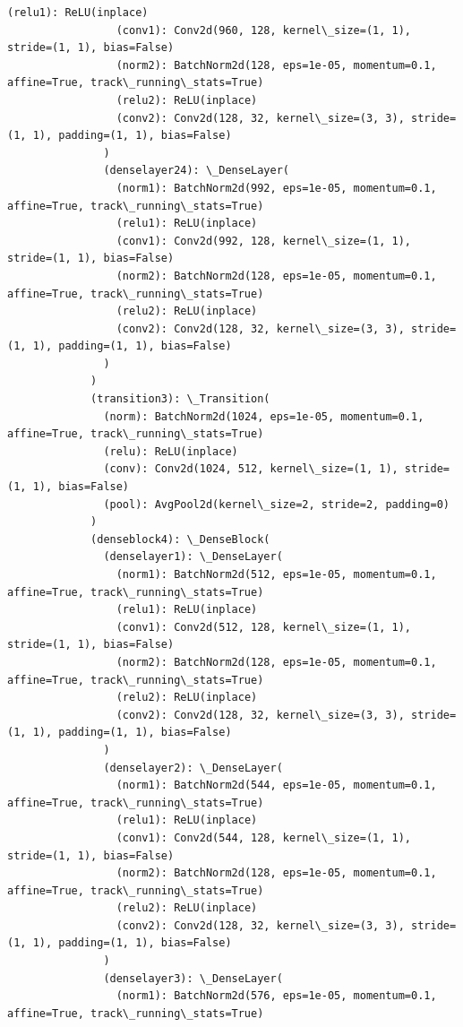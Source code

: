 \documentclass[11pt]{article}
\begin{document}
\begin{Verbatim}[commandchars=\\\{\}]
                 (relu1): ReLU(inplace)
                 (conv1): Conv2d(960, 128, kernel\_size=(1, 1), stride=(1, 1), bias=False)
                 (norm2): BatchNorm2d(128, eps=1e-05, momentum=0.1, affine=True, track\_running\_stats=True)
                 (relu2): ReLU(inplace)
                 (conv2): Conv2d(128, 32, kernel\_size=(3, 3), stride=(1, 1), padding=(1, 1), bias=False)
               )
               (denselayer24): \_DenseLayer(
                 (norm1): BatchNorm2d(992, eps=1e-05, momentum=0.1, affine=True, track\_running\_stats=True)
                 (relu1): ReLU(inplace)
                 (conv1): Conv2d(992, 128, kernel\_size=(1, 1), stride=(1, 1), bias=False)
                 (norm2): BatchNorm2d(128, eps=1e-05, momentum=0.1, affine=True, track\_running\_stats=True)
                 (relu2): ReLU(inplace)
                 (conv2): Conv2d(128, 32, kernel\_size=(3, 3), stride=(1, 1), padding=(1, 1), bias=False)
               )
             )
             (transition3): \_Transition(
               (norm): BatchNorm2d(1024, eps=1e-05, momentum=0.1, affine=True, track\_running\_stats=True)
               (relu): ReLU(inplace)
               (conv): Conv2d(1024, 512, kernel\_size=(1, 1), stride=(1, 1), bias=False)
               (pool): AvgPool2d(kernel\_size=2, stride=2, padding=0)
             )
             (denseblock4): \_DenseBlock(
               (denselayer1): \_DenseLayer(
                 (norm1): BatchNorm2d(512, eps=1e-05, momentum=0.1, affine=True, track\_running\_stats=True)
                 (relu1): ReLU(inplace)
                 (conv1): Conv2d(512, 128, kernel\_size=(1, 1), stride=(1, 1), bias=False)
                 (norm2): BatchNorm2d(128, eps=1e-05, momentum=0.1, affine=True, track\_running\_stats=True)
                 (relu2): ReLU(inplace)
                 (conv2): Conv2d(128, 32, kernel\_size=(3, 3), stride=(1, 1), padding=(1, 1), bias=False)
               )
               (denselayer2): \_DenseLayer(
                 (norm1): BatchNorm2d(544, eps=1e-05, momentum=0.1, affine=True, track\_running\_stats=True)
                 (relu1): ReLU(inplace)
                 (conv1): Conv2d(544, 128, kernel\_size=(1, 1), stride=(1, 1), bias=False)
                 (norm2): BatchNorm2d(128, eps=1e-05, momentum=0.1, affine=True, track\_running\_stats=True)
                 (relu2): ReLU(inplace)
                 (conv2): Conv2d(128, 32, kernel\_size=(3, 3), stride=(1, 1), padding=(1, 1), bias=False)
               )
               (denselayer3): \_DenseLayer(
                 (norm1): BatchNorm2d(576, eps=1e-05, momentum=0.1, affine=True, track\_running\_stats=True)

\end{Verbatim}
\end{document}
